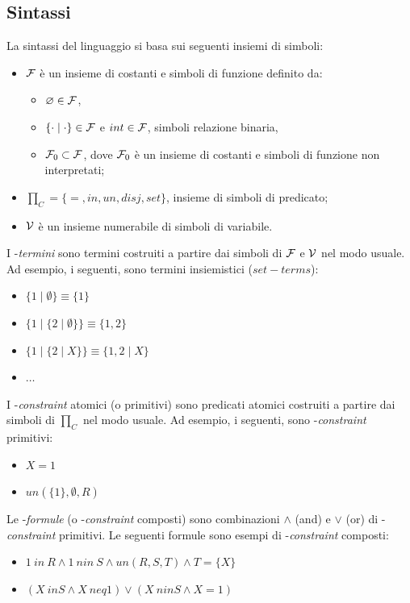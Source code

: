 \documentclass[12pt,a4paper,openright]{book} %
\begin{document}
\subsection{Sintassi}
\label{subsec:clpbasedlang_lset_sintax}

La sintassi del linguaggio \lset{} si basa sui seguenti insiemi di simboli:

\begin{itemize}
	\item $\mathcal{F}$ è un insieme di costanti e simboli di funzione
          definito da:
	\begin{itemize}
		\item $\varnothing \in \mathcal{F}$,
		\item $\{ \cdot \mid \cdot \} \in \mathcal{F}$ e $int \in
                  \mathcal{F}$, simboli relazione binaria,
		\item $\mathcal{F}_0 \subset \mathcal{F}$, dove $\mathcal{F}_0$ è un
                  insieme di costanti e simboli di funzione non
                  interpretati;
	\end{itemize}
	\item $\prod_C = \{ =, in, un, disj, set \}$, insieme di
          simboli di predicato;
	\item $\mathcal{V}$ è un insieme numerabile di simboli di variabile.
\end{itemize}

I \calset{}-\textit{termini} sono termini costruiti a partire dai
simboli di $\mathcal{F}$ e $\mathcal{V}$ nel modo usuale. Ad esempio, i seguenti,
sono termini insiemistici ($set-terms$):
\begin{itemize}
	\item $\{1 \mid \emptyset \} \equiv \{1\}$
	\item $\{1 \mid \{2 \mid \emptyset \} \} \equiv \{1,2\}$
	\item $\{1 \mid \{2 \mid X \} \} \equiv \{1,2 \mid X \}$
	\item $\ldots$
\end{itemize}

I \calset{}-\textit{constraint} atomici (o primitivi) sono predicati
atomici costruiti a partire dai simboli di $\prod_C$ nel modo
usuale. Ad esempio, i seguenti, sono \calset{}-\textit{constraint}
primitivi:
\begin{itemize}
	\item $X = 1$
	\item $un(\{1\}, \emptyset, R)$
\end{itemize}

Le \calset{}-\textit{formule} (o \calset{}-\textit{constraint}
composti) sono combinazioni $\wedge$ (and) e $\vee$ (or) di
\calset{}-\textit{constraint} primitivi. Le seguenti formule sono
esempi di \calset{}-\textit{constraint} composti:
\begin{itemize}
	\item $1\ in\ R \land 1\ nin\ S \land un(R,S,T) \land T = \{X\}$
	\item $(X\ in S \land X\ neq 1) \lor (X\ nin S \land X = 1)$
\end{itemize}
\end{document}
